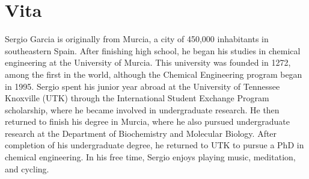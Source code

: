 \chapter*{Vita} \label{ch:vita}
Sergio Garcia is originally from Murcia, a city of 450,000 inhabitants in southeastern Spain.
After finishing high school, he began his studies in chemical engineering at the University of Murcia. This university was founded in 1272, among the first in the world, although the Chemical Engineering program began in 1995.
Sergio spent his junior year abroad at the University of Tennessee Knoxville (UTK) through the International Student Exchange Program scholarship, where he became involved in undergraduate research.
He then returned to finish his degree in Murcia, where he also pursued undergraduate research at the Department of Biochemistry and Molecular Biology.
After completion of his undergraduate degree, he returned to UTK to pursue a PhD in chemical engineering.
In his free time, Sergio enjoys playing music, meditation, and cycling.
